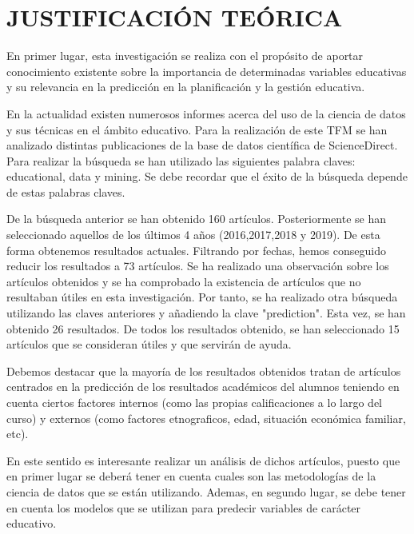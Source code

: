 \section{JUSTIFICACIÓN TEÓRICA}
En primer lugar, esta investigación se realiza con el propósito de aportar conocimiento existente sobre la importancia de determinadas variables educativas y su relevancia en la predicción en la planificación y la gestión educativa.

En la actualidad existen numerosos informes acerca del uso de la ciencia de datos y sus técnicas en el ámbito educativo. Para la realización de este TFM se han analizado distintas publicaciones de la base de datos científica de ScienceDirect. Para realizar la búsqueda se han utilizado las siguientes palabra claves: educational, data y mining. Se debe recordar que el éxito de la búsqueda depende de estas palabras claves.

De la búsqueda anterior se han obtenido 160 artículos. Posteriormente se han seleccionado aquellos de los últimos 4 años (2016,2017,2018 y 2019). De esta forma obtenemos resultados actuales. Filtrando por fechas, hemos conseguido reducir los resultados a 73 artículos. Se ha realizado una observación sobre los artículos obtenidos y se ha comprobado la existencia de artículos que no resultaban útiles en esta investigación. Por tanto, se ha realizado otra búsqueda utilizando las claves anteriores y añadiendo la clave "prediction". Esta vez, se han obtenido 26 resultados. De todos los resultados obtenido, se han seleccionado 15 artículos que se consideran útiles y que servirán de ayuda.

Debemos destacar que la mayoría de los resultados obtenidos tratan de artículos centrados en la predicción de los resultados académicos del alumnos teniendo en cuenta ciertos factores internos (como las propias calificaciones a lo largo del curso) y externos (como factores etnograficos, edad, situación económica familiar, etc).

En este sentido es interesante realizar un análisis de dichos artículos, puesto que en primer lugar se deberá tener en cuenta cuales son las metodologías de la ciencia de datos que se están utilizando. Ademas, en segundo lugar, se debe tener en cuenta los modelos que se utilizan para predecir variables de carácter educativo. 

